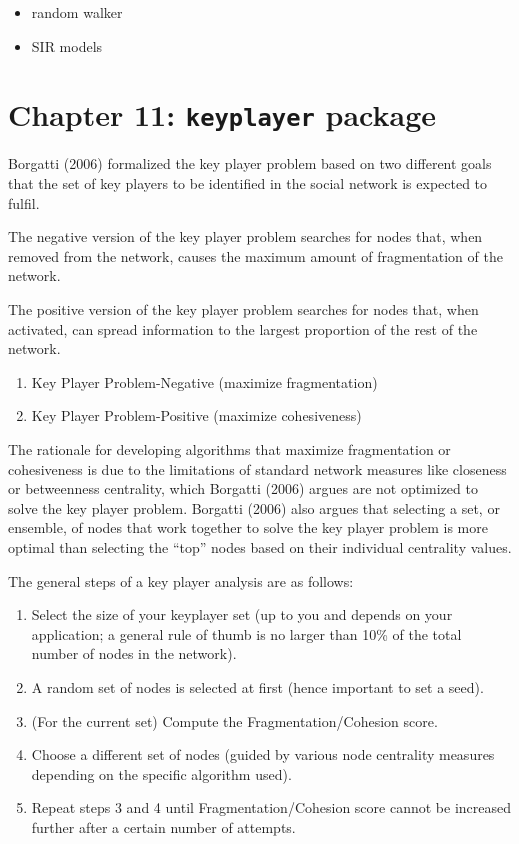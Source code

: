 \documentclass[
]{book}
\providecommand{\tightlist}{%
  \setlength{\itemsep}{0pt}\setlength{\parskip}{0pt}}
\begin{document}
\begin{itemize}
\tightlist
\item
  random walker
\item
  SIR models
\end{itemize}

\chapter{\texorpdfstring{Chapter 11: \texttt{keyplayer} package}{Chapter 11: keyplayer package}}\label{ch11}

Borgatti (2006) formalized the key player problem based on two different goals that the set of key players to be identified in the social network is expected to fulfil.

The negative version of the key player problem searches for nodes that, when removed from the network, causes the maximum amount of fragmentation of the network.

The positive version of the key player problem searches for nodes that, when activated, can spread information to the largest proportion of the rest of the network.

\begin{enumerate}
\def\labelenumi{\arabic{enumi}.}
\tightlist
\item
  Key Player Problem-Negative (maximize fragmentation)
\item
  Key Player Problem-Positive (maximize cohesiveness)
\end{enumerate}

The rationale for developing algorithms that maximize fragmentation or cohesiveness is due to the limitations of standard network measures like closeness or betweenness centrality, which Borgatti (2006) argues are not optimized to solve the key player problem. Borgatti (2006) also argues that selecting a set, or ensemble, of nodes that work together to solve the key player problem is more optimal than selecting the ``top'' nodes based on their individual centrality values.

The general steps of a key player analysis are as follows:

\begin{enumerate}
\def\labelenumi{\arabic{enumi}.}
\tightlist
\item
  Select the size of your keyplayer set (up to you and depends on your application; a general rule of thumb is no larger than 10\% of the total number of nodes in the network).
\item
  A random set of nodes is selected at first (hence important to set a seed).
\item
  (For the current set) Compute the Fragmentation/Cohesion score.
\item
  Choose a different set of nodes (guided by various node centrality measures depending on the specific algorithm used).
\item
  Repeat steps 3 and 4 until Fragmentation/Cohesion score cannot be increased further after a certain number of attempts.
\end{enumerate}
\end{document}
